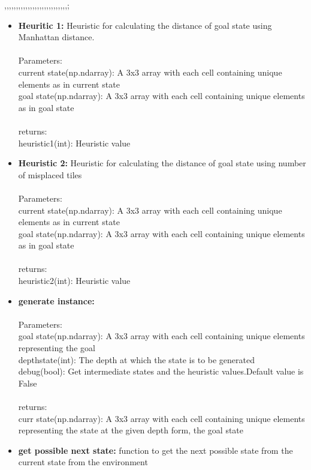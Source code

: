 ,,,,,,,,,,,,,,,,,,,,,,,,,,,;\documentclass[conference]{IEEEtran}
\begin{document}
\begin{itemize}
    \item \textbf{Heuritic 1:} 
Heuristic for calculating the distance of goal state
using Manhattan distance.\cite{b6}
\\
\\
Parameters:
\\
current state(np.ndarray): A 3x3 array with each
cell containing unique elements as in current state
\\
goal state(np.ndarray): A 3x3 array with each
cell containing unique elements as in goal state
\\
\\
returns:
\\
heuristic1(int): Heuristic value
\\
    \item \textbf{Heuristic 2:}
Heuristic for calculating the distance of goal state
using number of misplaced tiles
\\
\\
Parameters:
\\
current state(np.ndarray): A 3x3 array with each
cell containing unique elements as in current state
\\
goal state(np.ndarray): A 3x3 array with each
cell containing unique elements as in goal state
\\
\\
returns:
\\
heuristic2(int): Heuristic value
\\
   \item \textbf{generate instance:}
\\  
\\
Parameters:
\\
goal state(np.ndarray): A 3x3 array with each cell containing unique elements representing the goal
\\
depthstate(int): The depth at which the state is to be
generated
\\
debug(bool): Get intermediate states and the heuristic
values.Default value is False
\\
\\
returns:
\\
curr state(np.ndarray): A 3x3 array with each cell containing unique elements representing the state at the given depth form, the goal state   
\\
     \item \textbf{get possible next state:}
function to get the next possible state from the current state from the environment

\end{itemize}
\end{document}
